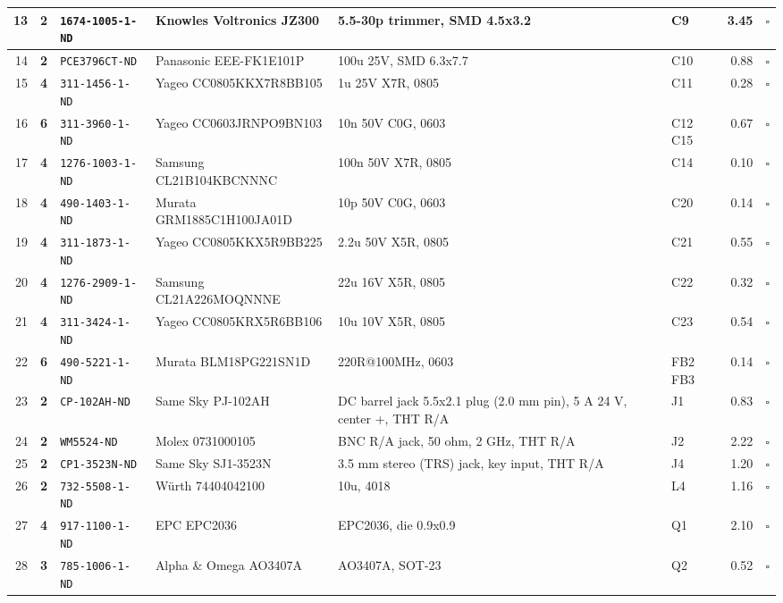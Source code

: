 \documentclass[10pt]{article}
\begin{document}
\begin{longtable}{|r|r|>{\raggedright}p{1.9in}|>{\raggedright}p{2.3in}|>{\raggedright}p{1.7in}|>{\raggedright}p{1.15in}|r|c|}
13 & \textbf{2} & \texttt{1674-1005-1-ND} & Knowles Voltronics JZ300 & 5.5-30p trimmer, SMD 4.5x3.2 & C9 & 3.45 & $\square$\\ \hline
14 & \textbf{2} & \texttt{PCE3796CT-ND} & Panasonic EEE-FK1E101P & 100u 25V, SMD 6.3x7.7 & C10 & 0.88 & $\square$\\ \hline
15 & \textbf{4} & \texttt{311-1456-1-ND} & Yageo CC0805KKX7R8BB105 & 1u 25V X7R, 0805 & C11 & 0.28 & $\square$\\ \hline
16 & \textbf{6} & \texttt{311-3960-1-ND} & Yageo CC0603JRNPO9BN103 & 10n 50V C0G, 0603 & C12 C15 & 0.67 & $\square$\\ \hline
17 & \textbf{4} & \texttt{1276-1003-1-ND} & Samsung CL21B104KBCNNNC & 100n 50V X7R, 0805 & C14 & 0.10 & $\square$\\ \hline
18 & \textbf{4} & \texttt{490-1403-1-ND} & Murata GRM1885C1H100JA01D & 10p 50V C0G, 0603 & C20 & 0.14 & $\square$\\ \hline
19 & \textbf{4} & \texttt{311-1873-1-ND} & Yageo CC0805KKX5R9BB225 & 2.2u 50V X5R, 0805 & C21 & 0.55 & $\square$\\ \hline
20 & \textbf{4} & \texttt{1276-2909-1-ND} & Samsung CL21A226MOQNNNE & 22u 16V X5R, 0805 & C22 & 0.32 & $\square$\\ \hline
21 & \textbf{4} & \texttt{311-3424-1-ND} & Yageo CC0805KRX5R6BB106 & 10u 10V X5R, 0805 & C23 & 0.54 & $\square$\\ \hline
22 & \textbf{6} & \texttt{490-5221-1-ND} & Murata BLM18PG221SN1D & 220R@100MHz, 0603 & FB2 FB3 & 0.14 & $\square$\\ \hline
23 & \textbf{2} & \texttt{CP-102AH-ND} & Same Sky PJ-102AH & DC barrel jack 5.5x2.1 plug (2.0 mm pin), 5 A 24 V, center +, THT R/A & J1 & 0.83 & $\square$\\ \hline
24 & \textbf{2} & \texttt{WM5524-ND} & Molex 0731000105 & BNC R/A jack, 50 ohm, 2 GHz, THT R/A & J2 & 2.22 & $\square$\\ \hline
25 & \textbf{2} & \texttt{CP1-3523N-ND} & Same Sky SJ1-3523N & 3.5 mm stereo (TRS) jack, key input, THT R/A & J4 & 1.20 & $\square$\\ \hline
26 & \textbf{2} & \texttt{732-5508-1-ND} & W\"urth 74404042100 & 10u, 4018 & L4 & 1.16 & $\square$\\ \hline
27 & \textbf{4} & \texttt{917-1100-1-ND} & EPC EPC2036 & EPC2036, die 0.9x0.9 & Q1 & 2.10 & $\square$\\ \hline
28 & \textbf{3} & \texttt{785-1006-1-ND} & Alpha \& Omega AO3407A & AO3407A, SOT-23 & Q2 & 0.52 & $\square$\\ \hline

\end{longtable}
\end{document}
